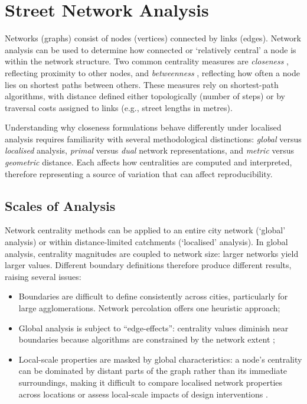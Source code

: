 \section{Street Network Analysis}\label{network-analysis}

Networks (graphs) consist of nodes (vertices) connected by links (edges). Network analysis can be used to determine how connected or `relatively central' a node is within the network structure. Two common centrality measures are \emph{closeness} \cite{Sabidussi1966}, reflecting proximity to other nodes, and \emph{betweenness} \cite{Freeman1977}, reflecting how often a node lies on shortest paths between others. These measures rely on shortest-path algorithms, with distance defined either topologically (number of steps) or by traversal costs assigned to links (e.g., street lengths in metres).

Understanding why closeness formulations behave differently under localised analysis requires familiarity with several methodological distinctions: \emph{global} versus \emph{localised} analysis, \emph{primal} versus \emph{dual} network representations, and \emph{metric} versus \emph{geometric} distance. Each affects how centralities are computed and interpreted, therefore representing a source of variation that can affect reproducibility.

\subsection{Scales of Analysis}

Network centrality methods can be applied to an entire city network (`global' analysis) or within distance-limited catchments (`localised' analysis). In global analysis, centrality magnitudes are coupled to network size: larger networks yield larger values. Different boundary definitions therefore produce different results, raising several issues:
\begin{itemize}
  \item Boundaries are difficult to define consistently across cities, particularly for large agglomerations. Network percolation \cite{Arcaute2016} offers one heuristic approach;
  \item Global analysis is subject to ``edge-effects'': centrality values diminish near boundaries because algorithms are constrained by the network extent \cite{Turner2007, van_nes_introduction_2021};
  \item Local-scale properties are masked by global characteristics: a node's centrality can be dominated by distant parts of the graph rather than its immediate surroundings, making it difficult to compare localised network properties across locations or assess local-scale impacts of design interventions \cite{Porta2009, van_nes_introduction_2021}.
\end{itemize}


